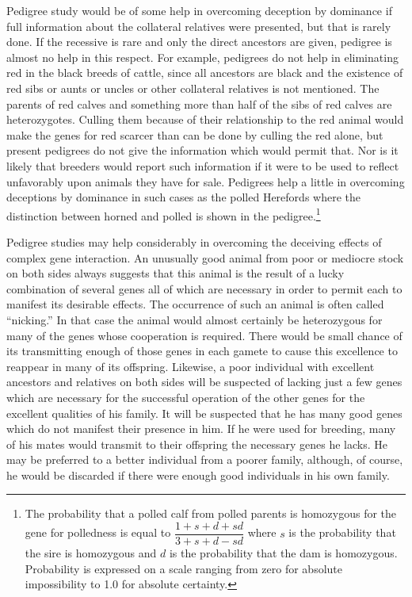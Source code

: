 Pedigree study would be of some help in overcoming deception by
dominance if full information about the collateral
relatives were presented,
but that is rarely done. If the recessive is rare and only the direct
ancestors are given, pedigree is almost no help in this respect. For example,
pedigrees do not help in eliminating red in the black breeds of
cattle, since all ancestors are black and the existence of red sibs or aunts
or uncles or other collateral relatives is not mentioned. The parents of
red calves and something more than half of the sibs of red calves are
heterozygotes. Culling them because of their relationship to the red animal
would make the genes for red scarcer than can be done by culling
the red alone, but present pedigrees do not give the information which
would permit that. Nor is it likely that breeders would report such
information if it were to be used to reflect unfavorably upon animals
they have for sale. Pedigrees help a little in overcoming deceptions by
dominance in such cases as the polled Herefords where the distinction
between horned and polled is shown in the pedigree.\footnote{The
probability that a polled calf from polled parents is homozygous for the
gene for polledness is equal to \(\dfrac{1 + s + d + sd}{3 + s + d - sd}\)
where $s$ is the probability that the sire is homozygous and $d$ is the
probability that the dam is homozygous. Probability is expressed on a scale
ranging from zero for absolute impossibility to 1.0 for absolute
certainty.}

Pedigree studies may help considerably in overcoming the deceiving
effects of complex gene interaction. An unusually good animal from
poor or mediocre stock on both sides always suggests that this animal is
the result of a lucky combination of several genes all of which are necessary
in order to permit each to manifest its desirable effects. The occurrence
of such an animal is often called ``nicking.'' In that case the
animal would almost certainly be heterozygous for many of the genes
whose cooperation is required. There would be small chance of its
transmitting enough of those genes in each gamete to cause this excellence
to reappear in many of its offspring. Likewise, a poor individual
with excellent ancestors and relatives on both sides will be suspected of
lacking just a few genes which are necessary for the successful operation
of the other genes for the excellent qualities of his family. It will be suspected
that he has many good genes which do not manifest their presence
in him. If he were used for breeding, many of his mates would
transmit to their offspring the necessary genes he lacks. He may be preferred
to a better individual from a poorer family, although, of course,
he would be discarded if there were enough good individuals in his own
family.

